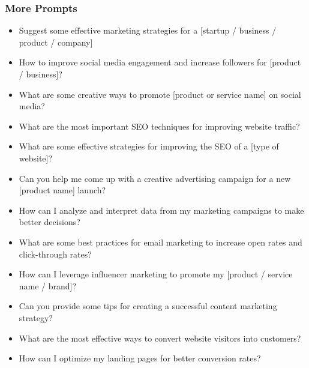 \begin{frame}[fragile]\frametitle{More Prompts}
{\tiny
\begin{itemize}
\item Suggest some effective marketing strategies for a [startup / business / product / company]
\item How to improve social media engagement and increase followers for [product / business]?
\item What are some creative ways to promote [product or service name] on social media?
\item What are the most important SEO techniques for improving website traffic?
\item What are some effective strategies for improving the SEO of a [type of website]?
\item Can you help me come up with a creative advertising campaign for a new [product name] launch?
\item How can I analyze and interpret data from my marketing campaigns to make better decisions?
\item What are some best practices for email marketing to increase open rates and click-through rates?
\item How can I leverage influencer marketing to promote my [product / service name / brand]?
\item Can you provide some tips for creating a successful content marketing strategy?
\item What are the most effective ways to convert website visitors into customers?
\item How can I optimize my landing pages for better conversion rates?
\end{itemize}
}
\end{frame}

